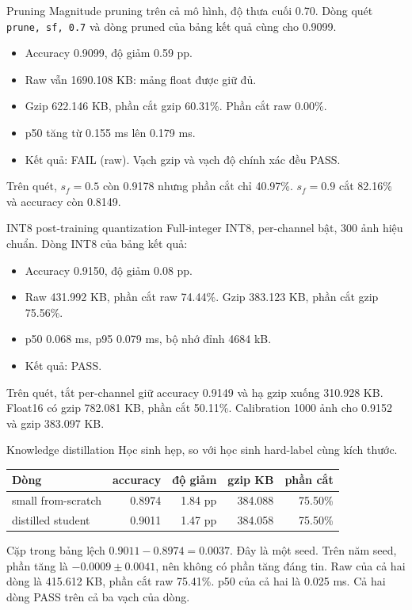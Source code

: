 \documentclass[aspectratio=169,11pt]{beamer}
\begin{document}
\begin{frame}{Pruning}
  Magnitude pruning trên cả mô hình, độ thưa cuối 0.70.
  Dòng quét \texttt{prune, sf, 0.7} và dòng pruned của bảng kết quả cùng cho 0.9099.
  \vspace{0.4em}
  \begin{itemize}
    \item Accuracy 0.9099, độ giảm 0.59 pp.
    \item Raw vẫn 1690.108 KB: mảng float được giữ đủ.
    \item Gzip 622.146 KB, phần cắt gzip 60.31\%. Phần cắt raw 0.00\%.
    \item p50 tăng từ 0.155 ms lên 0.179 ms.
    \item Kết quả: FAIL (raw). Vạch gzip và vạch độ chính xác đều PASS.
  \end{itemize}
  \vspace{0.2em}
  Trên quét, \(s_f=0.5\) còn 0.9178 nhưng phần cắt chỉ 40.97\%.
  \(s_f=0.9\) cắt 82.16\% và accuracy còn 0.8149.
\end{frame}

\begin{frame}{INT8 post-training quantization}
  Full-integer INT8, per-channel bật, 300 ảnh hiệu chuẩn.
  Dòng INT8 của bảng kết quả:
  \begin{itemize}
    \item Accuracy 0.9150, độ giảm 0.08 pp.
    \item Raw 431.992 KB, phần cắt raw 74.44\%. Gzip 383.123 KB, phần cắt gzip 75.56\%.
    \item p50 0.068 ms, p95 0.079 ms, bộ nhớ đỉnh 4684 kB.
    \item Kết quả: PASS.
  \end{itemize}
  \vspace{0.2em}
  Trên quét, tắt per-channel giữ accuracy 0.9149 và hạ gzip xuống 310.928 KB.
  Float16 có gzip 782.081 KB, phần cắt 50.11\%.
  Calibration 1000 ảnh cho 0.9152 và gzip 383.097 KB.
\end{frame}

\begin{frame}{Knowledge distillation}
  Học sinh hẹp, so với học sinh hard-label cùng kích thước.
  \vspace{0.3em}
  \begin{tabular}{lrrrr}
    \toprule
    Dòng & accuracy & độ giảm & gzip KB & phần cắt \\
    \midrule
    small from-scratch & 0.8974 & 1.84 pp & 384.088 & 75.50\% \\
    distilled student & 0.9011 & 1.47 pp & 384.058 & 75.50\% \\
    \bottomrule
  \end{tabular}
  \vspace{0.45em}
  Cặp trong bảng lệch \(0.9011-0.8974=0.0037\). Đây là một seed.
  Trên năm seed, phần tăng là \(-0.0009 \pm 0.0041\), nên không có phần tăng đáng tin.
  Raw của cả hai dòng là 415.612 KB, phần cắt raw 75.41\%.
  p50 của cả hai là 0.025 ms.
  Cả hai dòng PASS trên cả ba vạch của dòng.
\end{frame}
\end{document}
